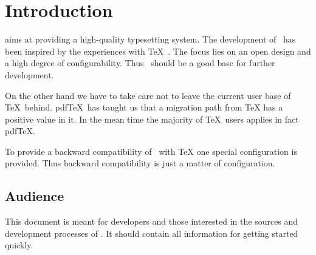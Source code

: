 \chapter{Introduction}

\ExTeX{} aims at providing a high-quality typesetting system. The
development of \ExTeX\ has been inspired by the experiences with \TeX\ 
\cite{knuth:texbook}.
The focus lies on an open design and a high degree of configurability.
Thus \ExTeX\ should be a good base for further development.

On the other hand we have to take care not to leave the current user
base of \TeX\ behind. pdf\TeX\ has taught us that a migration path
from \TeX\index{TeX@\TeX} has a positive value in it. In the mean time
the majority of \TeX\ users applies in fact
pdf\TeX{}.

To provide a backward compatibility of \ExTeX\ with
\TeX{} one special configuration is provided. Thus
backward compatibility is just a matter of configuration.


\section{Audience}

This document is meant for developers and those interested in the
sources and development processes of \ExTeX. It should contain all
information for getting started quickly.


